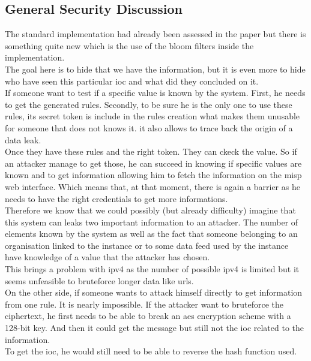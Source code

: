 \documentclass{eplmastersthesis}
\begin{document}
\subsection{General Security Discussion}
The standard implementation had already been assessed in the paper  but there is something quite new which is the use of the bloom filters inside the implementation.\\
The goal here is to hide that we have the information, but it is even more to hide who have seen this particular \gls{ioc} and what did they concluded on it.\\
If someone want to test if a specific value is known by the system. First, he needs to get the generated rules. Secondly, to be sure he is the only one to use these rules, its secret token is include in the rules creation what makes them unusable for someone that does not knows it. it also allows to trace back the origin of a data leak.\\
Once they have these rules and the right token. They can ckeck the value. So if an attacker manage to get those, he can succeed in knowing if specific values are known and to get information allowing him to fetch the information on the \gls{misp} web interface. Which means that, at that moment, there is again a barrier as he needs to have the right credentials to get more informations.\\

Therefore we know that we could possibly (but already difficulty) imagine that this system can leaks two important information to an attacker. The number of elements known by the system as well as the fact that someone belonging to an organisation linked to the instance or to some data feed used by the instance have knowledge of a value that the attacker has chosen.\\
This brings a problem with \gls{ipv4} as the number of possible \gls{ipv4} is limited but it seems unfeasible to bruteforce longer data like \gls{url}s.\\

On the other side, if someone wants to attack himself directly to get information from one rule. It is nearly impossible. If the attacker want to bruteforce the ciphertext, he first needs to be able to break an \gls{aes} encryption scheme with a 128-bit key. And then it could get the message but still not the \gls{ioc} related to the information.\\
To get the \gls{ioc}, he would still need to be able to reverse the hash function used.\\
\end{document}

